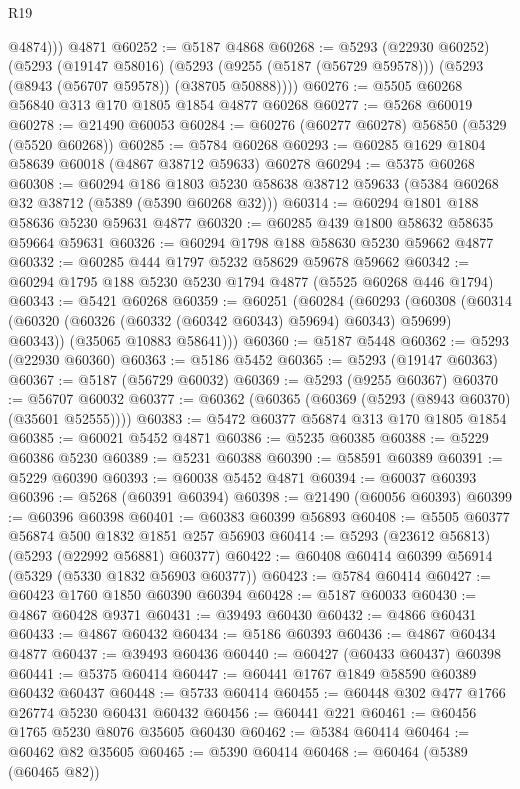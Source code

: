 \begin{lexlean}{R19}
\begin{coremodule}
          @4874)))
    @4871
@60252 := @5187 @4868
@60268 := @5293
    (@22930 @60252)
    (@5293
      (@19147 @58016)
      (@5293 (@9255 (@5187 (@56729 @59578))) (@5293 (@8943 (@56707 @59578)) (@38705 @50888))))
@60276 := @5505 @60268 @56840 @313 @170 @1805 @1854 @4877 @60268
@60277 := @5268 @60019
@60278 := @21490 @60053
@60284 := @60276 (@60277 @60278) @56850 (@5329 (@5520 @60268))
@60285 := @5784 @60268
@60293 := @60285 @1629 @1804 @58639 @60018 (@4867 @38712 @59633) @60278
@60294 := @5375 @60268
@60308 := @60294
    @186
    @1803
    @5230
    @58638
    @38712
    @59633
    (@5384 @60268 @32 @38712 (@5389 (@5390 @60268 @32)))
@60314 := @60294 @1801 @188 @58636 @5230 @59631 @4877
@60320 := @60285 @439 @1800 @58632 @58635 @59664 @59631
@60326 := @60294 @1798 @188 @58630 @5230 @59662 @4877
@60332 := @60285 @444 @1797 @5232 @58629 @59678 @59662
@60342 := @60294 @1795 @188 @5230 @5230 @1794 @4877 (@5525 @60268 @446 @1794)
@60343 := @5421 @60268
@60359 := @60251
    (@60284
      (@60293
        (@60308 (@60314 (@60320 (@60326 (@60332 (@60342 @60343) @59694) @60343) @59699) @60343))
        (@35065 @10883 @58641)))
@60360 := @5187 @5448
@60362 := @5293 (@22930 @60360)
@60363 := @5186 @5452
@60365 := @5293 (@19147 @60363)
@60367 := @5187 (@56729 @60032)
@60369 := @5293 (@9255 @60367)
@60370 := @56707 @60032
@60377 := @60362 (@60365 (@60369 (@5293 (@8943 @60370) (@35601 @52555))))
@60383 := @5472 @60377 @56874 @313 @170 @1805 @1854
@60385 := @60021 @5452 @4871
@60386 := @5235 @60385
@60388 := @5229 @60386 @5230
@60389 := @5231 @60388
@60390 := @58591 @60389
@60391 := @5229 @60390
@60393 := @60038 @5452 @4871
@60394 := @60037 @60393
@60396 := @5268 (@60391 @60394)
@60398 := @21490 (@60056 @60393)
@60399 := @60396 @60398
@60401 := @60383 @60399 @56893
@60408 := @5505 @60377 @56874 @500 @1832 @1851 @257 @56903
@60414 := @5293 (@23612 @56813) (@5293 (@22992 @56881) @60377)
@60422 := @60408 @60414 @60399 @56914 (@5329 (@5330 @1832 @56903 @60377))
@60423 := @5784 @60414
@60427 := @60423 @1760 @1850 @60390 @60394
@60428 := @5187 @60033
@60430 := @4867 @60428 @9371
@60431 := @39493 @60430
@60432 := @4866 @60431
@60433 := @4867 @60432
@60434 := @5186 @60393
@60436 := @4867 @60434 @4877
@60437 := @39493 @60436
@60440 := @60427 (@60433 @60437) @60398
@60441 := @5375 @60414
@60447 := @60441 @1767 @1849 @58590 @60389 @60432 @60437
@60448 := @5733 @60414
@60455 := @60448 @302 @477 @1766 @26774 @5230 @60431 @60432
@60456 := @60441 @221
@60461 := @60456 @1765 @5230 @8076 @35605 @60430
@60462 := @5384 @60414
@60464 := @60462 @82 @35605
@60465 := @5390 @60414
@60468 := @60464 (@5389 (@60465 @82))

\end{coremodule}
\end{lexlean}
